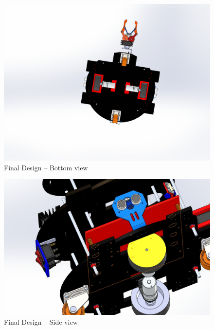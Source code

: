 \begin{figure}[h!]
	\centering
	\includegraphics[scale=0.23]{./Figures/Mech/lower.jpeg}
	\caption{Final Design -- Bottom view}
	\label{fig:mech2}
\end{figure}
\newpage
\begin{figure}[h!]
	\centering
	\includegraphics[scale=0.32]{./Figures/Mech/side.jpeg}
	\caption{Final Design -- Side view}
	\label{fig:mech3}
\end{figure}

